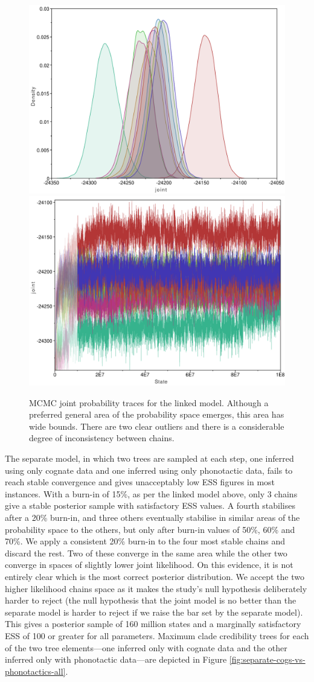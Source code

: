 \begin{figure}
\includegraphics[width=0.5\linewidth]{06-tree-inference/fig/joint_trace_dens_ch1-10} \includegraphics[width=0.5\linewidth]{06-tree-inference/fig/joint_trace_ch1-10} \caption[MCMC joint probability traces for the linked model]{MCMC joint probability traces for the linked model. Although a preferred general area of the probability space emerges, this area has wide bounds. There are two clear outliers and there is a considerable degree of inconsistency between chains.}\label{fig:linked-all-trace}
\end{figure}

The separate model, in which two trees are sampled at each step, one inferred using only cognate data and one inferred using only phonotactic data, fails to reach stable convergence and gives unacceptably low ESS figures in most instances. With a burn-in of 15\%, as per the linked model above, only 3 chains give a stable posterior sample with satisfactory ESS values. A fourth stabilises after a 20\% burn-in, and three others eventually stabilise in similar areas of the probability space to the others, but only after burn-in values of 50\%, 60\% and 70\%. We apply a consistent 20\% burn-in to the four most stable chains and discard the rest. Two of these converge in the same area while the other two converge in spaces of slightly lower joint likelihood. On this evidence, it is not entirely clear which is the most correct posterior distribution. We accept the two higher likelihood chains space as it makes the study's null hypothesis deliberately harder to reject (the null hypothesis that the joint model is no better than the separate model is harder to reject if we raise the bar set by the separate model). This gives a posterior sample of 160 million states and a marginally satisfactory ESS of 100 or greater for all parameters. Maximum clade credibility trees for each of the two tree elements---one inferred only with cognate data and the other inferred only with phonotactic data---are depicted in Figure \ref{fig:separate-cogs-vs-phonotactics-all}.

